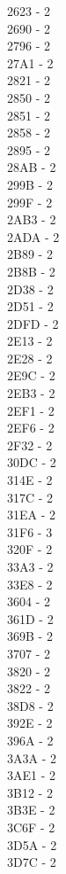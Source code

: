\documentclass[10pt,letterpaper]{article}
\begin{document}
\begin{multicols}{5}
2623 -  2\\
2690 -  2\\
2796 -  2\\
27A1 -  2\\
2821 -  2\\
2850 -  2\\
2851 -  2\\
2858 -  2\\
2895 -  2\\
28AB -  2\\
299B -  2\\
299F -  2\\
2AB3 -  2\\
2ADA -  2\\
2B89 -  2\\
2B8B -  2\\
2D38 -  2\\
2D51 -  2\\
2DFD -  2\\
2E13 -  2\\
2E28 -  2\\
2E9C -  2\\
2EB3 -  2\\
2EF1 -  2\\
2EF6 -  2\\
2F32 -  2\\
30DC -  2\\
314E -  2\\
317C -  2\\
31EA -  2\\
31F6 -  3\\
320F -  2\\
33A3 -  2\\
33E8 -  2\\
3604 -  2\\
361D -  2\\
369B -  2\\
3707 -  2\\
3820 -  2\\
3822 -  2\\
38D8 -  2\\
392E -  2\\
396A -  2\\
3A3A -  2\\
3AE1 -  2\\
3B12 -  2\\
3B3E -  2\\
3C6F -  2\\
3D5A -  2\\
3D7C -  2\\

\end{multicols}
\end{document}
